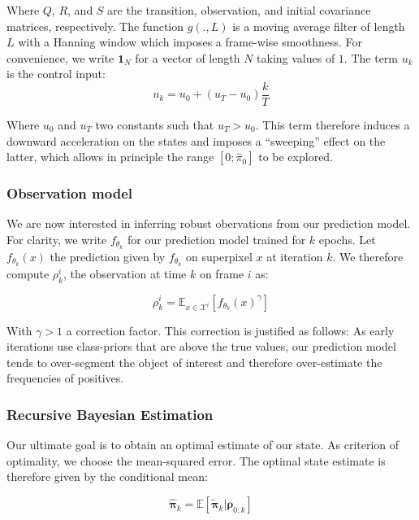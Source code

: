 Where $Q$, $R$, and $S$ are the transition, observation, and initial covariance matrices, respectively.
The function $g(., L)$ is a moving average filter of length $L$ with a Hanning window which imposes a frame-wise smoothness.
For convenience, we write $\mathbf{1}_{N}$ for a vector of length $N$ taking values of $1$.
The term $u_{k}$ is the control input:
\begin{equation}
u_{k} = u_{0} + (u_{T} - u_{0})\frac{k}{T}
\end{equation}

Where $u_{0}$ and $u_{T}$ two constants such that $u_{T} > u_{0}$.
This term therefore induces a downward acceleration on the states and imposes a ``sweeping'' effect on the latter, which allows in principle the range $[0; \hat \pi_{0}]$ to be explored.

\subsubsection{Observation model}
\label{sec:obs_model}
We are now interested in inferring robust obervations from our prediction model.
For clarity, we write $f_{\theta_{k}}$ for our prediction model trained for $k$ epochs.
Let $f_{\theta_{k}}(x)$ the prediction given by $f_{\theta_{k}}$ on superpixel $x$ at iteration $k$.
We therefore compute $\rho_{k}^{i}$, the observation at time $k$ on frame $i$ as:

\begin{equation}
  \label{eq:observ}
\rho_{k}^{i} = \mathbb{E}_{x \in \mathcal{X}^{i}}[f_{\theta_{k}}(x)^{\gamma}]
\end{equation}

With $\gamma > 1$ a correction factor.
This correction is justified as follows: As early iterations use class-priors that are above the true values,
our prediction model tends to over-segment the object of interest and therefore over-estimate the frequencies of positives.

\subsubsection{Recursive Bayesian Estimation}
Our ultimate goal is to obtain an optimal estimate of our state.
As criterion of optimality, we choose the mean-squared error.
The optimal state estimate is therefore given by the conditional mean:

\begin{equation}
  \label{eq:cond_mean}
\bm{\hat\pi}_{k} = \mathbb{E}[\bm{\tilde \pi}_{k} | \bm{\rho}_{0:k}]
\end{equation}

